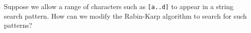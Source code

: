 Suppose we allow a range of characters such as {\tt [a..d]} to appear
in a string search pattern.  How can we modify the Rabin-Karp algorithm
to search for such patterns?
